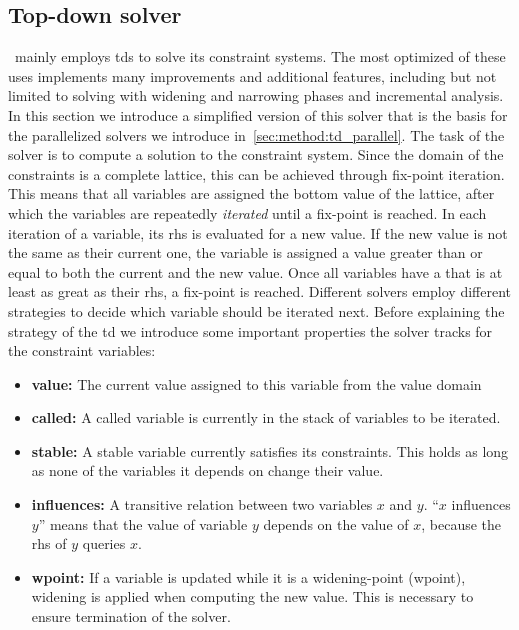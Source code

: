   \subsection{Top-down solver}
  \label{sec:background:td}
  \gob\ mainly employs \acp{td} to solve its constraint systems. The most optimized of these uses implements many improvements and additional features, including but not limited to solving with widening and narrowing phases and incremental analysis. 
  In this section we introduce a simplified version of this solver that is the basis for the parallelized solvers we introduce in~\autoref{sec:method:td_parallel}.
  The task of the solver is to compute a solution to the constraint system. Since the domain of the constraints is a complete lattice, this can be achieved through fix-point iteration. This means that all variables are assigned the bottom value of the lattice, after which the variables are repeatedly \textit{iterated} until a fix-point is reached. In each iteration of a variable, its \ac{rhs} is evaluated for a new value. If the new value is not the same as their current one, the variable is assigned a value greater than or equal to both the current and the new value. Once all variables have a that is at least as great as their \ac{rhs}, a fix-point is reached.
  Different solvers employ different strategies to decide which variable should be iterated next. Before explaining the strategy of the \ac{td} we introduce some important properties the solver tracks for the constraint variables:
  \begin{itemize}[leftmargin=*]
    \item \textbf{value:} The current value assigned to this variable from the value domain
    \item \textbf{called:} A called variable is currently in the stack of variables to be iterated.
    \item \textbf{stable:} A stable variable currently satisfies its constraints. This holds as long as none of the variables it depends on change their value.
    \item \textbf{influences:} A transitive relation between two variables $x$ and $y$. ``$x$ influences $y$'' means that the value of variable $y$ depends on the value of $x$, because the \ac{rhs} of $y$ queries $x$.
    \item \textbf{wpoint:} If a variable is updated while it is a widening-point (wpoint), widening is applied when computing the new value. This is necessary to ensure termination of the solver.
  \end{itemize}

